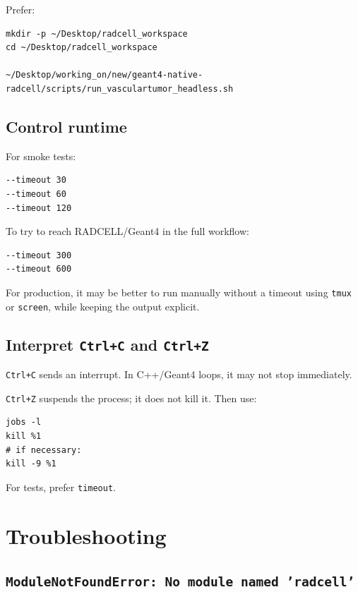 \documentclass[11pt,a4paper,twoside,pdftex]{refrep}
\begin{document}
Prefer:

\begin{lstlisting}
mkdir -p ~/Desktop/radcell_workspace
cd ~/Desktop/radcell_workspace

~/Desktop/working_on/new/geant4-native-radcell/scripts/run_vasculartumor_headless.sh
\end{lstlisting}

\section{Control runtime}

For smoke tests:

\begin{lstlisting}
--timeout 30
--timeout 60
--timeout 120
\end{lstlisting}

To try to reach RADCELL/Geant4 in the full workflow:

\begin{lstlisting}
--timeout 300
--timeout 600
\end{lstlisting}

For production, it may be better to run manually without a timeout using \texttt{tmux} or \texttt{screen}, while keeping the output explicit.

\section{Interpret \texttt{Ctrl+C} and \texttt{Ctrl+Z}}

\texttt{Ctrl+C} sends an interrupt. In C++/Geant4 loops, it may not stop immediately.

\texttt{Ctrl+Z} suspends the process; it does not kill it. Then use:

\begin{lstlisting}
jobs -l
kill %1
# if necessary:
kill -9 %1
\end{lstlisting}

For tests, prefer \texttt{timeout}.

\chapter{Troubleshooting}

\section{\texttt{ModuleNotFoundError: No module named 'radcell'}}
\end{document}
